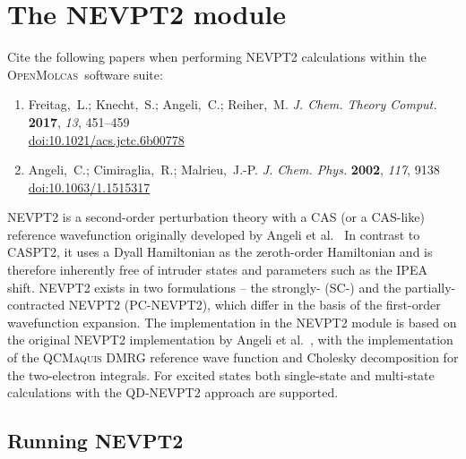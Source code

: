 \documentclass[bibliography=totoc,12pt,a4paper]{scrartcl}
\newcommand{\mol}{\textsc{OpenMolcas}}
\newcommand{\qcm}{\textsc{QCMaquis}}
\newcommand{\hostp}{\mol}
\begin{document}
\section{The NEVPT2 module}\label{sec:nevpt2}

\begin{framed}
 \noindent Cite the following papers when performing NEVPT2 calculations within the \hostp\ software suite:
\begin{enumerate}
\item Freitag,~L.; Knecht,~S.; Angeli,~C.; Reiher,~M. \emph{J. Chem. Theory Comput.}
  \textbf{2017}, \emph{13}, 451--459\\ \href{https://doi.org/10.1021/acs.jctc.6b00778}{doi:10.1021/acs.jctc.6b00778}
\item Angeli,~C.; Cimiraglia,~R.; Malrieu,~J.-P. \emph{J. Chem. Phys.} \textbf{2002},
  \emph{117}, 9138\\ \href{https://doi.org/10.1063/1.1515317}{doi:10.1063/1.1515317}
\end{enumerate}
\end{framed}

NEVPT2 is a second-order perturbation theory with a CAS (or a CAS-like) reference wavefunction originally developed by Angeli et al.~\cite{Angeli_JChemPhys_Introduction_2001,Angeli_ChemPhysLett_Nelectron_2001,Angeli_JChemPhys_nelectron_2002,Angeli_JChemPhys_quasidegenerate_2004} In contrast to CASPT2, it uses a Dyall Hamiltonian\cite{Dyall_JChemPhys_choice_1995} as the zeroth-order Hamiltonian and is therefore inherently free of intruder states and parameters such as the IPEA shift. NEVPT2 exists in two formulations -- the strongly- (SC-) and the partially-contracted NEVPT2 (PC-NEVPT2), which differ in the basis of the first-order wavefunction expansion. The implementation in the NEVPT2 module is based on the original NEVPT2 implementation by Angeli et al.~\cite{Angeli_JChemPhys_nelectron_2002,Angeli_JChemPhys_quasidegenerate_2004}, with the implementation of the \qcm{} DMRG reference wave function and Cholesky decomposition for the two-electron integrals\cite{chimia,Freitag_JChemTheoryComput_Multireference_2017}.
For excited states both single-state and multi-state calculations with the QD-NEVPT2 approach\cite{Angeli_JChemPhys_quasidegenerate_2004} are supported.

\subsection{Running NEVPT2}
\end{document}
